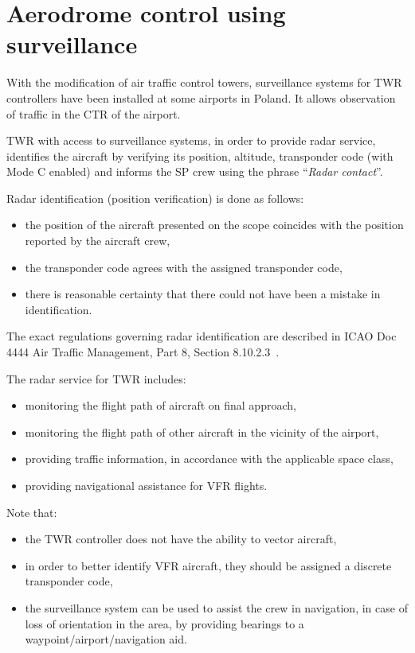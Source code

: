 \section{Aerodrome control using surveillance}
With the modification of air traffic control towers, surveillance systems for TWR controllers have been installed at some airports in Poland. It allows observation of traffic in the CTR of the airport.

TWR with access to surveillance systems, in order to provide radar service, identifies the aircraft by verifying its position, altitude, transponder code (with Mode C enabled) and informs the SP crew using the phrase ``\emph{Radar contact}''.

Radar identification (position verification) is done as follows:
\begin{itemize}
    \item the position of the aircraft presented on the scope coincides with the position reported by the aircraft crew,
    \item the transponder code agrees with the assigned transponder code,
    \item there is reasonable certainty that there could not have been a mistake in identification.
\end{itemize}

The exact regulations governing radar identification are described in ICAO Doc 4444 Air Traffic Management, Part 8, Section 8.10.2.3~\cite{4444}.

The radar service for TWR includes:
\begin{itemize}
    \item monitoring the flight path of aircraft on final approach,
    \item monitoring the flight path of other aircraft in the vicinity of the airport,
    \item providing traffic information, in accordance with the applicable space class,
    \item providing navigational assistance for VFR flights.
\end{itemize}

Note that:
\begin{itemize}
    \item the TWR controller does not have the ability to vector aircraft,
    \item in order to better identify VFR aircraft, they should be assigned a discrete transponder code,
    \item the surveillance system can be used to assist the crew in navigation, in case of loss of orientation in the area, by providing bearings to a waypoint/airport/navigation aid.
\end{itemize}

